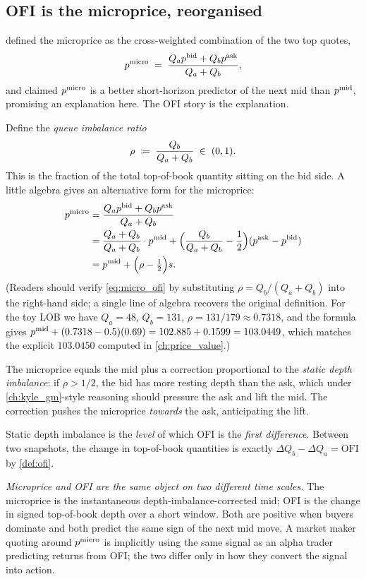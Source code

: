 \subsection{OFI is the microprice, reorganised}
\label{sec:microprice_ofi}

 defined the microprice as the
cross-weighted combination of the two top quotes,
\[
  p^{\mathrm{micro}}
  \;=\;
  \frac{Q_a p^{\mathrm{bid}} + Q_b p^{\mathrm{ask}}}{Q_a + Q_b},
\]
and claimed $p^{\mathrm{micro}}$ is a better short-horizon predictor of the
next mid than $p^{\mathrm{mid}}$, promising an explanation here. The OFI
story is the explanation.

Define the \emph{queue imbalance ratio}
\[
  \rho \;\coloneqq\; \frac{Q_b}{Q_a + Q_b} \;\in\; (0, 1).
\]
This is the fraction of the total top-of-book quantity sitting on
the bid side. A little algebra gives an alternative form for
the microprice:
\begin{align}
  p^{\mathrm{micro}}
  &= \frac{Q_a p^{\mathrm{bid}} + Q_b p^{\mathrm{ask}}}{Q_a + Q_b} \\
  &= \frac{Q_a + Q_b}{Q_a + Q_b} \cdot p^{\mathrm{mid}}
     + \Bigl(\frac{Q_b}{Q_a+Q_b} - \frac{1}{2}\Bigr)(p^{\mathrm{ask}} - p^{\mathrm{bid}}) \\
  &= p^{\mathrm{mid}} + \Bigl(\rho - \tfrac{1}{2}\Bigr) s.
  \label{eq:micro_ofi}
\end{align}
(Readers should verify \cref{eq:micro_ofi} by substituting
$\rho = Q_b/(Q_a+Q_b)$ into the right-hand side; a single line of
algebra recovers the original definition. For the toy LOB we
have $Q_a = 48$, $Q_b = 131$, $\rho = 131/179 \approx 0.7318$,
and the formula gives
$p^{\mathrm{mid}} + (0.7318 - 0.5)(0.69) = 102.885 + 0.1599 = 103.0449$,
which matches the explicit $103.0450$ computed in
\cref{ch:price_value}.)

The microprice equals the mid plus a correction proportional to
the \emph{static depth imbalance}: if $\rho > 1/2$, the bid has
more resting depth than the ask, which under
\cref{ch:kyle_gm}-style reasoning should pressure the ask and
lift the mid. The correction pushes the microprice \emph{towards}
the ask, anticipating the lift.

Static depth imbalance is the \emph{level} of which OFI is the
\emph{first difference}. Between two snapshots, the change in
top-of-book quantities is exactly
$\Delta Q_b - \Delta Q_a = \mathrm{OFI}$ by \cref{def:ofi}.

\emph{Microprice and OFI are the same object on two different
time scales.} The microprice is the instantaneous
depth-imbalance-corrected mid; OFI is the change in signed
top-of-book depth over a short window. Both are positive when
buyers dominate and both predict the same sign of the next mid
move. A market maker quoting around $p^{\mathrm{micro}}$ is implicitly using
the same signal as an alpha trader predicting returns from OFI;
the two differ only in how they convert the signal into action.

